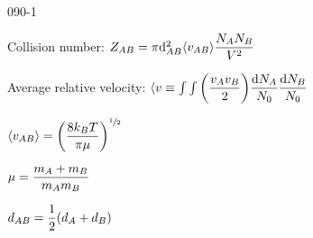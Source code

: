 \begin{mitframe}{090-1}
    
\begin{listone}
	\item Collision number: $\compress_{\helmholtz\exergy}=\pi\mathrm{d}_{\helmholtz\exergy}^2\langle\vvel_{\helmholtz\exergy}\rangle\dfrac{\nummoles_{\helmholtz}\nummoles_{\exergy}}{\vol^2}$
        	\begin{listtwo}
        	\item Average relative velocity: $\langle\vvel\equiv\int\int\bigg(\dfrac{\vvel_{\helmholtz}\vvel_{\exergy}}{2}\bigg)\dfrac{\mathrm{d}\nummoles_{\helmholtz}}{\nummoles_{\init}}\dfrac{\mathrm{d}\nummoles_{\exergy}}{\nummoles_{\init}}$
        	\begin{listthree}
                   		\item $\langle\vvel_{\helmholtz\exergy}\rangle=\bigg(\dfrac{8\thermcond_{\exergy}\Temp}{\pi\chempot}\bigg)^{\sfrac{1}{2}}$
                    \begin{listfour}
                    \item $\chempot=\dfrac{\mass_{\helmholtz}+\mass_{\exergy}}{\mass_{\helmholtz}\mass_{\exergy}}$
                	\end{listfour}
                \end{listthree}
        	\item $d_{\helmholtz\exergy}=\dfrac{1}{2}(d_{\helmholtz}+d_{\exergy})
$            %
       \end{listtwo}
\end{listone}    
\end{mitframe}
